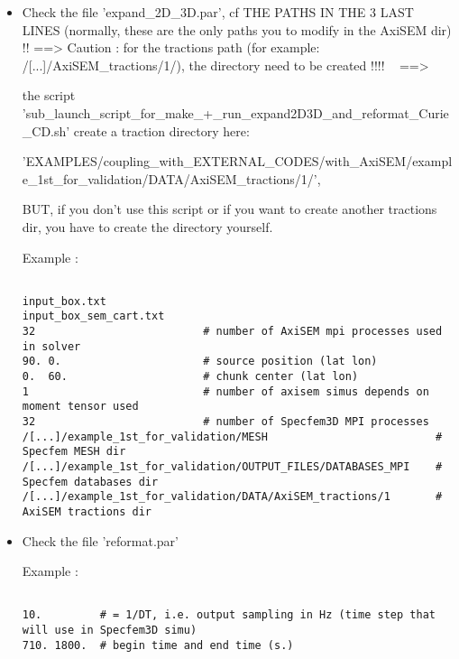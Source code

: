 \documentclass[11pt]{article}
\begin{document}
\begin{itemize}

\item[\textbullet] {\color{red} Check the file 'expand\_2D\_3D.par', cf THE PATHS IN THE 3 LAST LINES (normally, these are the only paths you to modify in the AxiSEM dir) !!} ==> Caution : for the tractions path (for example: /[...]/AxiSEM\_tractions/1/), the directory need to be created !!!! {\color{red} ~ ==>}

the script 'sub\_launch\_script\_for\_make\_+\_run\_expand2D3D\_and\_reformat\_Curie\_CD.sh' create a traction directory here:

\smallskip

{\footnotesize 'EXAMPLES/coupling\_with\_EXTERNAL\_CODES/with\_AxiSEM/example\_1st\_for\_validation/DATA/AxiSEM\_tractions/1/', }


BUT, if you don't use this script or if you want to create another tractions dir, you have to create the directory yourself.

\smallskip

\noindent Example :
\begin{verbatim}

input_box.txt
input_box_sem_cart.txt
32                          # number of AxiSEM mpi processes used in solver
90. 0.                      # source position (lat lon)
0.  60.                     # chunk center (lat lon)
1                           # number of axisem simus depends on moment tensor used
32                          # number of Specfem3D MPI processes
/[...]/example_1st_for_validation/MESH                          # Specfem MESH dir
/[...]/example_1st_for_validation/OUTPUT_FILES/DATABASES_MPI    # Specfem databases dir
/[...]/example_1st_for_validation/DATA/AxiSEM_tractions/1       # AxiSEM tractions dir

\end{verbatim}

\item[\textbullet] Check the file 'reformat.par'

\smallskip

\noindent Example :
\begin{verbatim}

10.         # = 1/DT, i.e. output sampling in Hz (time step that will use in Specfem3D simu)
710. 1800.  # begin time and end time (s.)

\end{verbatim}

\end{itemize}
\end{document}
